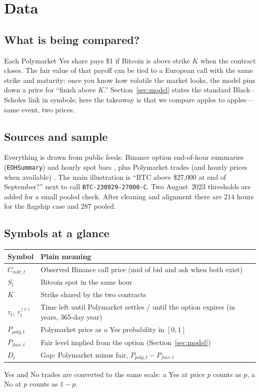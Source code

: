 \documentclass[11pt]{article}
\numberwithin{equation}{section}
\theoremstyle{plain}
\begin{document}
\section{Data}
\subsection{What is being compared?}
Each Polymarket Yes share pays \$1 if Bitcoin is above strike $K$ when the contract closes. The fair value of that payoff can be tied to a European call with the same strike and maturity: once you know how volatile the market looks, the model pins down a price for ``finish above $K$.'' Section~\ref{sec:model} states the standard Black--Scholes link in symbols; here the takeaway is that we compare apples to apples---same event, two prices.

\subsection{Sources and sample}
Everything is drawn from public feeds: Binance option end-of-hour summaries (\texttt{EOHSummary}) and hourly spot bars \citep{binancepublicdata}, plus Polymarket trades (and hourly prices when available) \citep{polymarketdocs}. The main illustration is ``BTC above \$27{,}000 at end of September?'' next to call \texttt{BTC-230929-27000-C}. Two August~2023 thresholds are added for a small pooled check. After cleaning and alignment there are $214$ hours for the flagship case and $287$ pooled.

\subsection{Symbols at a glance}
\begin{center}
\begin{tabular}{ll}
\toprule
Symbol & Plain meaning \\
\midrule
$C_{mkt,t}$ & Observed Binance call price (mid of bid and ask when both exist) \\
$S_t$ & Bitcoin spot in the same hour \\
$K$ & Strike shared by the two contracts \\
$\tau_t$, $\tau_t^{(c)}$ & Time left until Polymarket settles / until the option expires (in years, 365-day year) \\
$P_{poly,t}$ & Polymarket price as a Yes probability in $[0,1]$ \\
$P_{fair,t}$ & Fair level implied from the option (Section~\ref{sec:model}) \\
$D_t$ & Gap: Polymarket minus fair, $P_{poly,t}-P_{fair,t}$ \\
\bottomrule
\end{tabular}
\end{center}
Yes and No trades are converted to the same scale: a Yes at price $p$ counts as $p$, a No at $p$ counts as $1-p$.
\end{document}
